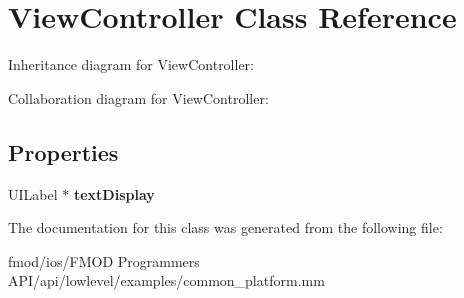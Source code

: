 \hypertarget{interface_view_controller}{\section{View\+Controller Class Reference}
\label{interface_view_controller}
}


Inheritance diagram for View\+Controller\+:


Collaboration diagram for View\+Controller\+:
\subsection*{Properties}
\begin{DoxyCompactItemize}
\item 
\hypertarget{interface_view_controller_a881757d87a95235b03612fa9ea64adcb}{U\+I\+Label $\ast$ {\bfseries text\+Display}}\label{interface_view_controller_a881757d87a95235b03612fa9ea64adcb}

\end{DoxyCompactItemize}


The documentation for this class was generated from the following file\+:\begin{DoxyCompactItemize}
\item 
fmod/ios/\+F\+M\+O\+D Programmers A\+P\+I/api/lowlevel/examples/common\+\_\+platform.\+mm\end{DoxyCompactItemize}
